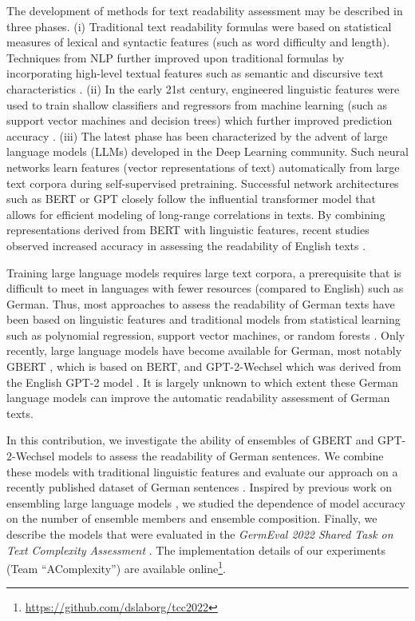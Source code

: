 \documentclass[11pt,a4paper]{article}
\begin{document}
The development of methods for text readability assessment may be described in three phases.
(i) Traditional text readability formulas were based on statistical measures of lexical and syntactic features (such as word difficulty and length).
Techniques from NLP further improved upon traditional formulas by incorporating high-level textual features such as semantic and discursive text characteristics \cite{Martinc2021}.
(ii) In the early 21st century, engineered linguistic features were used to train shallow classifiers and regressors from machine learning (such as support vector machines and decision trees)  which further improved prediction accuracy \cite{CollinsThompson2014}.
(iii) The latest phase has been characterized by the advent of large language models (LLMs) developed in the Deep Learning community.
Such neural networks learn features (vector representations of text) automatically from large text corpora during self-supervised pretraining.
Successful network architectures such as BERT \cite{Devlin2018,Rogers2020} or GPT \cite{Radford2018,Radford2019,Brown2020} closely follow the influential transformer model \cite{Vaswani2017} that allows for efficient modeling of long-range correlations in texts.
By combining representations derived from BERT with linguistic features, recent studies observed increased accuracy in assessing the readability of English texts \cite{Lee2021,Imperial2021}.

Training large language models requires large text corpora, a prerequisite that is difficult to meet in languages with fewer resources (compared to English) such as German.
Thus, most approaches to assess the readability of German texts have been based on linguistic features and traditional models from statistical learning such as polynomial regression, support vector machines, or random forests \cite{Hancke2012,Weiss2018,Naderi2019b,Weiss2021}.
Only recently, large language models have become available for German, most notably GBERT \cite{Chan2020}, which is based on BERT, and \mbox{GPT-2-Wechsel} \cite{Minixhofer2021} which was derived from the English GPT-2 model \cite{Radford2019}.
It is largely unknown to which extent these German language models can improve the automatic readability assessment of German texts.

In this contribution, we investigate the ability of ensembles of GBERT and GPT-2-Wechsel models to assess the readability of German sentences.
We combine these models with traditional linguistic features and evaluate our approach on a recently published dataset of German sentences \cite{Naderi2019a}.
Inspired by previous work on ensembling large language models \cite{Risch2020,Bornheim2021}, we studied the dependence of model accuracy on the number of ensemble members and ensemble composition.
Finally, we describe the models that were evaluated in the \emph{GermEval 2022 Shared Task on Text Complexity Assessment} \cite{Mohtaj2022}.
The implementation details of our experiments (Team \enquote{AComplexity}) are available online\footnote{\url{https://github.com/dslaborg/tcc2022}}. 
\end{document}
